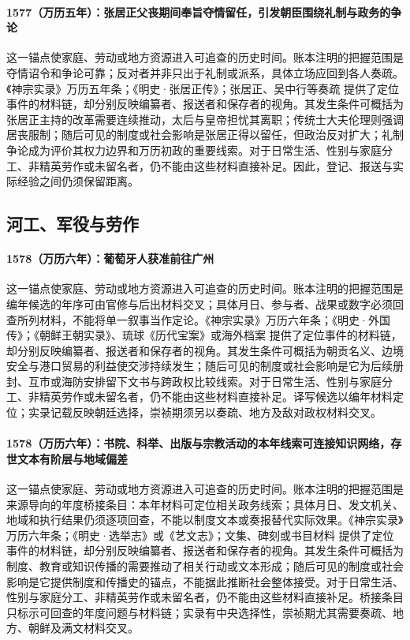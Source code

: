 \paragraph{1577（万历五年）：张居正父丧期间奉旨夺情留任，引发朝臣围绕礼制与政务的争论} 这一锚点使家庭、劳动或地方资源进入可追查的历史时间。账本注明的把握范围是夺情诏令和争论可靠；反对者并非只出于礼制或派系，具体立场应回到各人奏疏。《神宗实录》万历五年条；《明史·张居正传》；张居正、吴中行等奏疏 提供了定位事件的材料链，却分别反映编纂者、报送者和保存者的视角。其发生条件可概括为张居正主持的改革需要连续推动，太后与皇帝担忧其离职；传统士大夫伦理则强调居丧服制；随后可见的制度或社会影响是张居正得以留任，但政治反对扩大；礼制争论成为评价其权力边界和万历初政的重要线索。对于日常生活、性别与家庭分工、非精英劳作或未留名者，仍不能由这些材料直接补足。因此，登记、报送与实际经验之间仍须保留距离。

\subsection{河工、军役与劳作}

\paragraph{1578（万历六年）：葡萄牙人获准前往广州} 这一锚点使家庭、劳动或地方资源进入可追查的历史时间。账本注明的把握范围是编年候选的年序可由官修与后出材料交叉；具体月日、参与者、战果或数字必须回查所列材料，不能将单一叙事当作定论。《神宗实录》万历六年条；《明史·外国传》；《朝鲜王朝实录》、琉球《历代宝案》或海外档案 提供了定位事件的材料链，却分别反映编纂者、报送者和保存者的视角。其发生条件可概括为朝贡名义、边境安全与港口贸易的利益使交涉持续发生；随后可见的制度或社会影响是它为后续册封、互市或海防安排留下文书与跨政权比较线索。对于日常生活、性别与家庭分工、非精英劳作或未留名者，仍不能由这些材料直接补足。译写候选以编年材料定位；实录记载反映朝廷选择，崇祯期须另以奏疏、地方及敌对政权材料交叉。

\paragraph{1578（万历六年）：书院、科举、出版与宗教活动的本年线索可连接知识网络，存世文本有阶层与地域偏差} 这一锚点使家庭、劳动或地方资源进入可追查的历史时间。账本注明的把握范围是来源导向的年度桥接条目：本年材料可定位相关政务线索；具体月日、发文机关、地域和执行结果仍须逐项回查，不能以制度文本或奏报替代实际效果。《神宗实录》万历六年条；《明史·选举志》或《艺文志》；文集、碑刻或书目材料 提供了定位事件的材料链，却分别反映编纂者、报送者和保存者的视角。其发生条件可概括为制度、教育或知识传播的需要推动了相关行动或文本形成；随后可见的制度或社会影响是它提供制度和传播史的锚点，不能据此推断社会整体接受。对于日常生活、性别与家庭分工、非精英劳作或未留名者，仍不能由这些材料直接补足。桥接条目只标示可回查的年度问题与材料链；实录有中央选择性，崇祯期尤其需要奏疏、地方、朝鲜及满文材料交叉。

